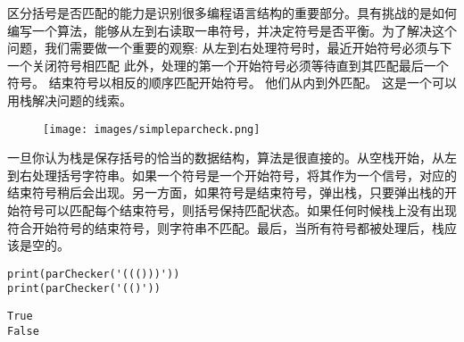 \documentclass[9pt]{beamer}
\begin{document}
\begin{frame}[fragile]\ft{\subsubsecname}
区分括号是否匹配的能力是识别很多编程语言结构的重要部分。具有挑战的是如何编写一个算法，能够从左到右读取一串符号，并决定符号是否平衡。为了解决这个问题，我们需要做一个重要的观察: 从左到右处理符号时，最近开始符号必须与下一个关闭符号相匹配
此外，处理的第一个开始符号必须等待直到其匹配最后一个符号。
结束符号以相反的顺序匹配开始符号。
他们从内到外匹配。
这是一个可以用栈解决问题的线索。
\begin{figure}[htbp]
        \centering
        \texttt{[image: images/simpleparcheck.png]}
\end{figure}
\end{frame}

\begin{frame}[fragile]\ft{\subsubsecname}
一旦你认为栈是保存括号的恰当的数据结构，算法是很直接的。从空栈开始，从左到右处理括号字符串。如果一个符号是一个开始符号，将其作为一个信号，对应的结束符号稍后会出现。另一方面，如果符号是结束符号，弹出栈，只要弹出栈的开始符号可以匹配每个结束符号，则括号保持匹配状态。如果任何时候栈上没有出现符合开始符号的结束符号，则字符串不匹配。最后，当所有符号都被处理后，栈应该是空的。
\end{frame}

\begin{frame}[fragile]\ft{\subsubsecname}

\end{frame}

\begin{frame}[fragile]\ft{\subsubsecname}
\begin{lstlisting}
print(parChecker('((()))'))
print(parChecker('(()'))
\end{lstlisting}
\begin{lstlisting}[frame=no]
True
False
\end{lstlisting} 
\end{frame}
\end{document}
